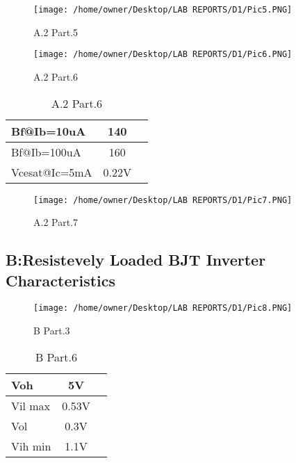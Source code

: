 \documentclass{article}
\begin{document}
\begin{figure}[H]
	\centering
	\texttt{[image: /home/owner/Desktop/LAB REPORTS/D1/Pic5.PNG]}
	\caption[A.2 Part.5 Plot]{A.2 Part.5}
	\label{fig:pic}
\end{figure}

\begin{figure}[H]
	\centering
	\texttt{[image: /home/owner/Desktop/LAB REPORTS/D1/Pic6.PNG]}
	\caption[A.2 Part.6 electronic set-up]{A.2 Part.6}
	\label{fig:pic}
\end{figure}

\begin{table}[H]
	\centering
	\label{tab:fourthTable}
	\caption[A.2 Part.6 Plot Values Table]{A.2 Part.6}
	\begin{tabular}{lcr}
		Bf@Ib=10uA&140 \\ \hline
		Bf@Ib=100uA&160\\ \hline
		Vcesat@Ic=5mA&0.22V\\ \hline
	\end{tabular}
\end{table}


\begin{figure}[H]
	\centering
	\texttt{[image: /home/owner/Desktop/LAB REPORTS/D1/Pic7.PNG]}
	\caption[A.2 Part.7 Plot]{A.2 Part.7}
	\label{fig:pic}
\end{figure}


\subsection{B:Resistevely Loaded BJT Inverter Characteristics}

\begin{figure}[H]
	\centering
	\texttt{[image: /home/owner/Desktop/LAB REPORTS/D1/Pic8.PNG]}
	\caption[B Part.3 electronic set-up]{B Part.3}
	\label{fig:pic}
\end{figure}


\begin{table}[H]
	\centering
	\label{tab:fifthTable}
	\caption[B Part.6 Table]{B Part.6 }
	\begin{tabular}{lcr}
		Voh&5V \\ \hline
		Vil max&0.53V\\ \hline
		Vol&0.3V\\ \hline
		Vih min&1.1V\\ \hline
	\end{tabular}
\end{table}
\end{document}
